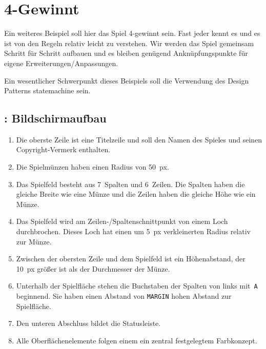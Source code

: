 \newpage

\section{4-Gewinnt}
Ein weiteres Beispiel soll hier das Spiel 4-gewinnt sein. Fast jeder kennt es und es ist von den Regeln relativ leicht zu verstehen. Wir werden das Spiel gemeinsam Schritt für Schritt aufbauen und es bleiben genügend Anknüpfungspunkte für eigene Erweiterungen/Anpassungen.

Ein wesentlicher Schwerpunkt dieses Beispiels soll die Verwendung des Design Patterns \Gls{statemachine} sein. 

\subsection{: Bildschirmaufbau}

\begin{enumerate}
    \item Die oberste Zeile ist eine Titelzeile und soll den Namen des Spieles und seinen Copyright-Vermerk enthalten.\label{reqFourConnectScreen01}
    \item Die Spielmünzen haben einen Radius von \SI{50}{px}.\label{reqFourConnectScreen02}
    \item Das Spielfeld besteht aus \SI{7}{Spalten} und \SI{6}{Zeilen}. Die Spalten haben die gleiche Breite wie eine Münze und die Zeilen haben die gleiche Höhe wie ein Münze.\label{reqFourConnectScreen03}
    \item Das Spielfeld wird am Zeilen-/Spaltenschnittpunkt von einem Loch durchbrochen. Dieses Loch hat einen um \SI{5}{px} verkleinerten Radius relativ zur Münze.\label{reqFourConnectScreen04}
    \item Zwischen der obersten Zeile und dem Spielfeld ist ein Höhenabstand, der \SI{10}{px} größer ist als der Durchmesser der Münze.\label{reqFourConnectScreen05}
    \item Unterhalb der Spielfläche stehen die Buchstaben der Spalten von links mit~\texttt{A} beginnend. Sie haben einen Abstand von \texttt{MARGIN} hohen Abstand zur Spielfläche.\label{reqFourConnectScreen06}
    \item Den unteren Abschluss bildet die Statusleiste.\label{reqFourConnectScreen07}
    \item Alle Oberflächenelemente folgen einem ein zentral festgelegtem Farbkonzept.\label{reqFourConnectScreen08}
\end{enumerate}
\er

